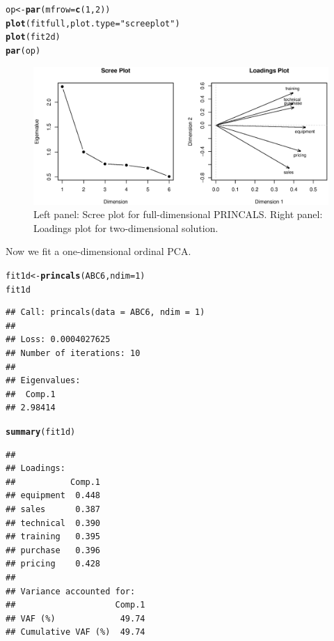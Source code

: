 \documentclass[10pt,nojss,nofooter,fleqn]{jss}\usepackage[]{graphicx}\usepackage[]{color}
\makeatletter
\def\maxwidth{ %
  \ifdim\Gin@nat@width>\linewidth
    \linewidth
  \else
    \Gin@nat@width
  \fi
}
\newcommand{\hlnum}[1]{\textcolor[rgb]{0.686,0.059,0.569}{#1}}%
\newcommand{\hlstr}[1]{\textcolor[rgb]{0.192,0.494,0.8}{#1}}%
\newcommand{\hlstd}[1]{\textcolor[rgb]{0.345,0.345,0.345}{#1}}%
\newcommand{\hlkwb}[1]{\textcolor[rgb]{0.69,0.353,0.396}{#1}}%
\newcommand{\hlkwc}[1]{\textcolor[rgb]{0.333,0.667,0.333}{#1}}%
\newcommand{\hlkwd}[1]{\textcolor[rgb]{0.737,0.353,0.396}{\textbf{#1}}}%
\newenvironment{kframe}{%
 \def\at@end@of@kframe{}%
 \ifinner\ifhmode%
  \def\at@end@of@kframe{\end{minipage}}%
  \begin{minipage}{\columnwidth}%
 \fi\fi%
 \def\FrameCommand##1{\hskip\@totalleftmargin \hskip-\fboxsep
 \colorbox{shadecolor}{##1}\hskip-\fboxsep
     \hskip-\linewidth \hskip-\@totalleftmargin \hskip\columnwidth}%
 \MakeFramed {\advance\hsize-\width
   \@totalleftmargin\z@ \linewidth\hsize
   \@setminipage}}%
 {\par\unskip\endMakeFramed%
 \at@end@of@kframe}
\newenvironment{knitrout}{}{} %
\makeatother
\begin{document}
\begin{knitrout}
\color{fgcolor}\begin{kframe}
\begin{alltt}
\hlstd{op} \hlkwb{<-} \hlkwd{par}\hlstd{(}\hlkwc{mfrow} \hlstd{=} \hlkwd{c}\hlstd{(}\hlnum{1}\hlstd{,}\hlnum{2}\hlstd{))}
\hlkwd{plot}\hlstd{(fitfull,} \hlkwc{plot.type} \hlstd{=} \hlstr{"screeplot"}\hlstd{)}
\hlkwd{plot}\hlstd{(fit2d)}
\hlkwd{par}\hlstd{(op)}
\end{alltt}
\end{kframe}
\end{knitrout}
\begin{figure}
\begin{center}  %
\begin{knitrout}
\color{fgcolor}
\includegraphics[width=\maxwidth]{figure/abcscree-plot1-1} 

\end{knitrout}
\end{center}
\caption{\label{fig:abcscree} Left panel: Scree plot for full-dimensional PRINCALS. Right panel: 
Loadings plot for two-dimensional solution.}
\end{figure}

Now we fit a one-dimensional ordinal PCA.
\begin{knitrout}
\color{fgcolor}\begin{kframe}
\begin{alltt}
\hlstd{fit1d} \hlkwb{<-} \hlkwd{princals}\hlstd{(ABC6,} \hlkwc{ndim} \hlstd{=} \hlnum{1}\hlstd{)}
\hlstd{fit1d}
\end{alltt}
\begin{verbatim}
## Call: princals(data = ABC6, ndim = 1)
## 
## Loss: 0.0004027625
## Number of iterations: 10 
## 
## Eigenvalues:
##  Comp.1 
## 2.98414
\end{verbatim}
\begin{alltt}
\hlkwd{summary}\hlstd{(fit1d)}
\end{alltt}
\begin{verbatim}
## 
## Loadings: 
##           Comp.1
## equipment  0.448
## sales      0.387
## technical  0.390
## training   0.395
## purchase   0.396
## pricing    0.428
## 
## Variance accounted for:
##                    Comp.1
## VAF (%)             49.74
## Cumulative VAF (%)  49.74
\end{verbatim}
\end{kframe}
\end{knitrout}
\end{document}

